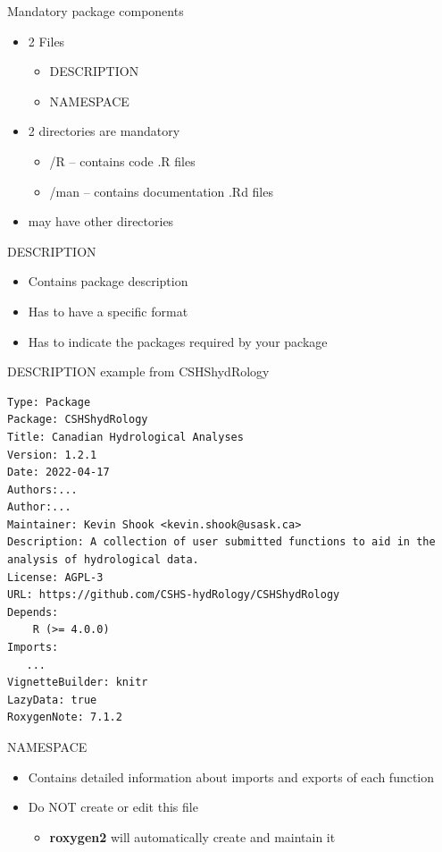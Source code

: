 \documentclass[
  ignorenonframetext,
  aspectratio=169]{beamer}
\providecommand{\tightlist}{%
  \setlength{\itemsep}{0pt}\setlength{\parskip}{0pt}}
\begin{document}
\begin{frame}{Mandatory package components}
\protect\hypertarget{mandatory-package-components}{}
\begin{itemize}
\tightlist
\item
  2 Files

  \begin{itemize}
  \tightlist
  \item
    DESCRIPTION
  \item
    NAMESPACE
  \end{itemize}
\item
  2 directories are mandatory

  \begin{itemize}
  \tightlist
  \item
    /R -- contains code .R files
  \item
    /man -- contains documentation .Rd files
  \end{itemize}
\item
  may have other directories
\end{itemize}
\end{frame}

\begin{frame}{DESCRIPTION}
\protect\hypertarget{description}{}
\begin{itemize}
\tightlist
\item
  Contains package description
\item
  Has to have a specific format
\item
  Has to indicate the packages required by your package
\end{itemize}
\end{frame}

\begin{frame}[fragile]{DESCRIPTION example from CSHShydRology}
\protect\hypertarget{description-example-from-cshshydrology}{}
\begin{verbatim}
Type: Package
Package: CSHShydRology
Title: Canadian Hydrological Analyses
Version: 1.2.1
Date: 2022-04-17
Authors:...
Author:...
Maintainer: Kevin Shook <kevin.shook@usask.ca>
Description: A collection of user submitted functions to aid in the analysis of hydrological data.
License: AGPL-3 
URL: https://github.com/CSHS-hydRology/CSHShydRology
Depends: 
    R (>= 4.0.0)
Imports: 
   ...
VignetteBuilder: knitr
LazyData: true
RoxygenNote: 7.1.2
\end{verbatim}
\end{frame}

\begin{frame}{NAMESPACE}
\protect\hypertarget{namespace}{}
\begin{itemize}
\tightlist
\item
  Contains detailed information about imports and exports of each
  function
\item
  Do NOT create or edit this file

  \begin{itemize}
  \tightlist
  \item
    \textbf{roxygen2} will automatically create and maintain it
  \end{itemize}
\end{itemize}
\end{frame}
\end{document}
